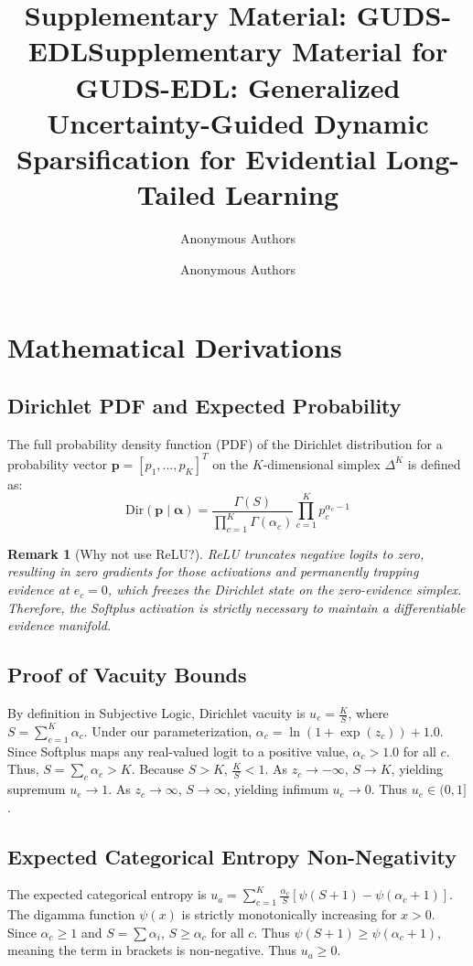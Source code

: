 \documentclass[letterpaper]{article} %
\title{Supplementary Material: GUDS-EDL}
\author{Anonymous Authors}
\newtheorem{remark}{Remark}
\begin{document}
\title{Supplementary Material for GUDS-EDL: Generalized Uncertainty-Guided Dynamic Sparsification for Evidential Long-Tailed Learning}
\author{Anonymous Authors}
\maketitle

\appendix

\section{Mathematical Derivations}

\subsection{Dirichlet PDF and Expected Probability}
The full probability density function (PDF) of the Dirichlet distribution for a probability vector $\bm{p} = [p_1, \dots, p_K]^T$ on the $K$-dimensional simplex $\Delta^K$ is defined as:
\begin{equation}
    \text{Dir}(\bm{p} \mid \bm{\alpha}) = \frac{\Gamma(S)}{\prod_{c=1}^K \Gamma(\alpha_c)} \prod_{c=1}^K p_c^{\alpha_c - 1}
\end{equation}

\begin{remark}[Why not use ReLU?]
ReLU truncates negative logits to zero, resulting in zero gradients for those activations and permanently trapping evidence at $e_c = 0$, which freezes the Dirichlet state on the zero-evidence simplex. Therefore, the Softplus activation is strictly necessary to maintain a differentiable evidence manifold.
\end{remark}

\subsection{Proof of Vacuity Bounds}
By definition in Subjective Logic, Dirichlet vacuity is $u_e = \frac{K}{S}$, where $S = \sum_{c=1}^K \alpha_c$. Under our parameterization, $\alpha_c = \ln(1 + \exp(z_c)) + 1.0$. Since Softplus maps any real-valued logit to a positive value, $\alpha_c > 1.0$ for all $c$. Thus, $S = \sum_c \alpha_c > K$. Because $S > K$, $\frac{K}{S} < 1$. As $z_c \to -\infty$, $S \to K$, yielding supremum $u_e \to 1$. As $z_c \to \infty$, $S \to \infty$, yielding infimum $u_e \to 0$. Thus $u_e \in (0, 1]$.

\subsection{Expected Categorical Entropy Non-Negativity}
The expected categorical entropy is $u_a = \sum_{c=1}^K \frac{\alpha_c}{S} [\psi(S + 1) - \psi(\alpha_c + 1)]$. The digamma function $\psi(x)$ is strictly monotonically increasing for $x > 0$. Since $\alpha_c \ge 1$ and $S = \sum \alpha_i$, $S \ge \alpha_c$ for all $c$. Thus $\psi(S + 1) \ge \psi(\alpha_c + 1)$, meaning the term in brackets is non-negative. Thus $u_a \ge 0$.
\end{document}
